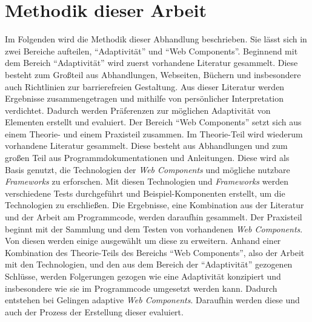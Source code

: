 \documentclass[12pt, paper=a4, bibtotoc, toc=listof, headsepline=true, numbers=endperiod]{scrreprt}
\begin{document}
\chapter{Methodik dieser Arbeit}
Im Folgenden wird die Methodik dieser Abhandlung beschrieben. Sie lässt sich in zwei Bereiche aufteilen, \enquote{Adaptivität} und \enquote{Web Components}.
Beginnend mit dem Bereich \enquote{Adaptivität} wird zuerst vorhandene Literatur gesammelt. Diese besteht zum Großteil aus Abhandlungen, Webseiten, Büchern und insbesondere auch Richtlinien zur barrierefreien Gestaltung. Aus dieser Literatur werden Ergebnisse zusammengetragen und mithilfe von persönlicher Interpretation verdichtet. Dadurch werden Präferenzen zur möglichen Adaptivität von Elementen erstellt und evaluiert.
\newline
Der Bereich \enquote{Web Components} setzt sich aus einem Theorie- und einem Praxisteil zusammen. Im Theorie-Teil wird wiederum vorhandene Literatur gesammelt. Diese besteht aus Abhandlungen und zum großen Teil aus Programmdokumentationen und Anleitungen. Diese wird als Basis genutzt, die Technologien der \emph{Web Components} und mögliche nutzbare \emph{Frameworks} zu erforschen. Mit diesen Technologien und \emph{Frameworks} werden verschiedene Tests durchgeführt und Beispiel-Komponenten erstellt, um die Technologien zu erschließen. Die Ergebnisse, eine Kombination aus der Literatur und der Arbeit am Programmcode, werden daraufhin gesammelt. Der Praxisteil beginnt mit der Sammlung und dem Testen von vorhandenen \emph{Web Components}. Von diesen werden einige ausgewählt um diese zu erweitern. Anhand einer Kombination des Theorie-Teils des Bereichs \enquote{Web Components}, also der Arbeit mit den Technologien, und den aus dem Bereich der \enquote{Adaptivität} gezogenen Schlüsse, werden Folgerungen gezogen wie eine Adaptivität konzipiert und insbesondere wie sie im Programmcode umgesetzt werden kann. Dadurch entstehen bei Gelingen adaptive \emph{Web Components}. Daraufhin werden diese und auch der Prozess der Erstellung dieser evaluiert.
\end{document}
